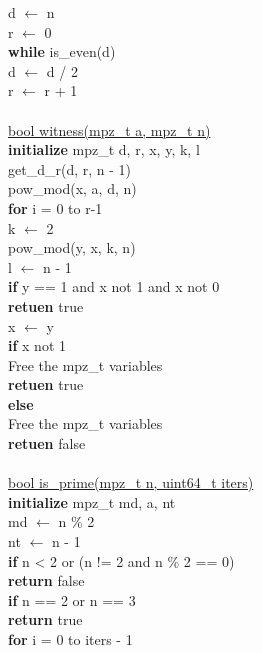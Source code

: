 \documentclass[12pt]{article}
\begin{document}
\indent d $\leftarrow$ n \\
\indent r $\leftarrow$ 0 \\
\indent \textbf{while} is\_even(d) \\
\indent \indent d $\leftarrow$ d / 2 \\
\indent \indent r $\leftarrow$ r + 1 \\
\\
\underline{bool witness(mpz\_t a, mpz\_t n)} \\
\indent \textbf{initialize} mpz\_t d, r, x, y, k, l \\
\indent get\_d\_r(d, r, n - 1) \\
\indent pow\_mod(x, a, d, n) \\
\indent \textbf{for} i = 0 to r-1 \\
\indent \indent k $\leftarrow$ 2 \\
\indent \indent pow\_mod(y, x, k, n) \\
\indent \indent l $\leftarrow$  n - 1 \\
\indent \indent \textbf{if} y == 1 and x not 1 and x not 0 \\
\indent \indent \indent \textbf{retuen} true \\
\indent \indent x $\leftarrow$ y \\
\indent \indent \textbf{if} x not 1 \\
\indent \indent \indent Free the mpz\_t variables \\
\indent \indent \indent \textbf{retuen} true \\
\indent \indent \textbf{else} \\
\indent \indent \indent Free the mpz\_t variables \\
\indent \indent \indent \textbf{retuen} false \\
\\
\underline{bool is\_prime(mpz\_t n, uint64\_t iters)} \\
\indent \textbf{initialize} mpz\_t md, a, nt \\
\indent md $\leftarrow$ n \% 2 \\
\indent nt $\leftarrow$ n - 1 \\
\indent \textbf{if} n < 2 or (n != 2 and n \% 2 == 0) \\
\indent \indent \textbf{return} false \\
\indent \textbf{if} n == 2 or n == 3 \\
\indent \indent \textbf{return} true \\
\indent \textbf{for} i = 0 to iters - 1 \\
\end{document}
